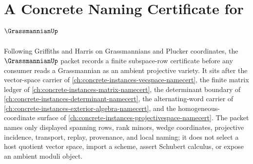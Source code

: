 \chapter{A Concrete Naming Certificate for $\GrassmannianUp$}
\label{ch:concrete-instances-grassmannian-namecert}

Following Griffiths and Harris on Grassmannians and Plucker coordinates, the $\GrassmannianUp$ packet records a finite subspace-row certificate before any consumer reads a Grassmannian as an ambient projective variety. It sits after the vector-space carrier of \autoref{ch:concrete-instances-vecspace-namecert}, the finite matrix ledger of \autoref{ch:concrete-instances-matrix-namecert}, the determinant boundary of \autoref{ch:concrete-instances-determinant-namecert}, the alternating-word carrier of \autoref{ch:concrete-instances-exterior-algebra-namecert}, and the homogeneous-coordinate surface of \autoref{ch:concrete-instances-projectivespace-namecert}. The packet names only displayed spanning rows, rank minors, wedge coordinates, projective incidence, transport, replay, provenance, and local naming; it does not select a host quotient vector space, import a scheme, assert Schubert calculus, or expose an ambient moduli object.

